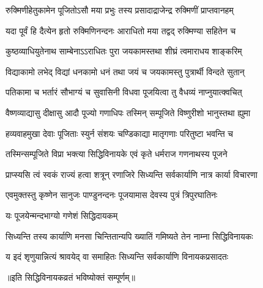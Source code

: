 \twolineshloka
{रुक्मिणीहेतुकामेन पूजितोऽसौ मया प्रभुः}
{तस्य प्रसादाद्राजेन्द्र रुक्मिणीं प्राप्तवानहम्}%

\twolineshloka
{यदा पूर्वं हि दैत्येन हृतो रुक्मिणिनन्दनः}
{आराधितो मया तद्वद् रुक्मिण्या सहितेन च}%

\twolineshloka
{कुष्ठव्याधियुतेनाथ साम्बेनाऽऽराधितः पुरा}
{जयकामस्तथा शीघ्रं त्वमाराधय शाङ्करिम्}%

\twolineshloka
{विद्याकामो लभेद् विद्यां धनकामो धनं तथा}
{जयं च जयकामस्तु पुत्रार्थी विन्दते सुतान्}%

\twolineshloka
{पतिकामा च भर्तारं सौभाग्यं च सुवासिनी}
{विधवा पूजयित्वा तु वैधव्यं नाप्नुयात्क्वचित्}%

\twolineshloka
{वैष्णव्याद्यासु दीक्षासु आदौ पूज्यो गणाधिपः}
{तस्मिन् सम्पूजिते विष्णुरीशो भानुस्तथा ह्युमा}%

\twolineshloka
{हव्यवाहमुखा देवाः पूजिताः स्युर्न संशयः}
{चण्डिकाद्या मातृगणाः परितुष्टा भवन्ति च}%

\twolineshloka
{तस्मिन्सम्पूजिते विप्रा भक्त्या सिद्धिविनायके}
{एवं कृते धर्मराज गणनाथस्य पूजने}%

\twolineshloka
{प्राप्स्यसि त्वं स्वकं राज्यं हत्वा शत्रून् रणाजिरे}
{सिध्यन्ति सर्वकार्याणि नात्र कार्या विचारणा}%

\twolineshloka
{एवमुक्तस्तु कृष्णेन सानुजः पाण्डुनन्दनः}
{पूजयामास देवस्य पुत्रं त्रिपुरघातिनः}%


\onelineshloka
{यः पूजयेन्मन्दभाग्यो गणेशं सिद्धिदायकम्}%

\twolineshloka
{सिध्यन्ति तस्य कार्याणि मनसा चिन्तितान्यपि}
{ख्यातिं गमिष्यते तेन नाम्ना सिद्धिविनायकः}%

\twolineshloka
{य इदं शृणुयान्नित्यं श्रावयेद् वा समाहितः}
{सिध्यन्ति सर्वकार्याणि विनायकप्रसादतः}%

॥इति सिद्धिविनायकव्रतं भविष्योक्तं सम्पूर्णम्॥
